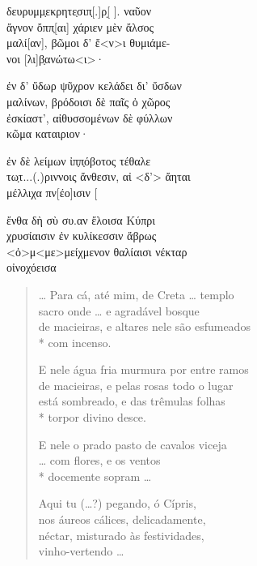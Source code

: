 \begin{gkverse}
\dagger{}δευρυμμ̣εκρητε̣σιπ̣[.]ρ[̣ \quad].\dagger{} ναῦον\\
ἄγνον ὄππ̣[αι\quad] χάριεν μὲν ἄλσος\\
μαλί[αν], βῶμοι δ’ ἔ<ν>ι θυμιάμε-\\
νοι [λι]β̣ανώτω<ι>·

ἐν δ’ ὔδωρ ψῦχρον κελάδει δι’ ὔσδων\\
μαλίνων, βρόδοισι δὲ παῖς ὀ χῶρος\\
ἐσκίαστ’, αἰθυσσομένων δὲ φύλλων\\
κῶμα \dagger{}καταιριον·

ἐν δὲ λείμων ἰπ̣π̣όβοτος τέθαλε\\
\dagger{}τω̣τ...(.)ριννοις\dagger{} ἄνθεσιν, αἰ <δ’> ἄηται\\
μέλλιχα πν[έο]ισιν [\\
\quad[\qquad\qquad]

ἔνθα δὴ σὺ \dagger{}συ.αν\dagger{} ἔλοισα Κύπρι\\
χρυσίαισιν ἐν κυλίκεσσιν ἄβρως\\
<ὀ>μ<με>μείχμενον θαλίαισι νέκταρ\\
οἰνοχόεισα
\end{gkverse}

\begin{verse}
\ldots{} Para cá, até mim, de Creta \ldots{} templo\\
sacro onde \ldots{} e agradável bosque\\
de macieiras, e altares nele são esfumeados\\*
com incenso.

E nele água fria murmura por entre ramos\\
de macieiras, e pelas rosas todo o lugar\\
está sombreado, e das trêmulas folhas\\*
torpor divino desce.

E nele o prado pasto de cavalos viceja\\
\ldots{} com flores, e os ventos\\*
docemente sopram \ldots{}

Aqui tu (\ldots{}?) pegando, ó Cípris,\\ \EP[1]
nos áureos cálices, delicadamente,\\
néctar, misturado às festividades,\\
vinho-vertendo \ldots{}
\end{verse}


